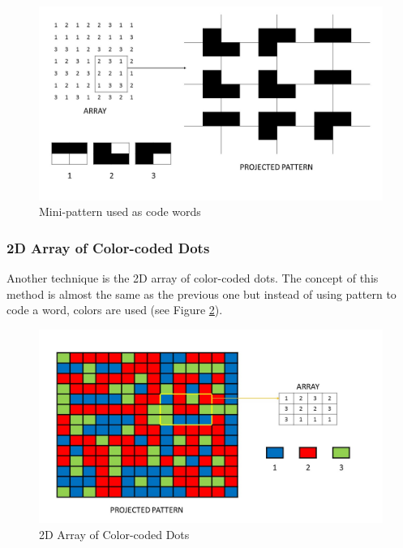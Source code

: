 \begin{figure}[h]
  \centerline{\includegraphics[scale=0.5]{fig/codeWords.jpg}}
  \caption{Mini-pattern used as code words}
  \label{fig:codeWords}
\end{figure}





\subsubsection{2D Array of Color-coded Dots}

Another technique is the 2D array of color-coded dots. The concept of this method is almost the same as the previous one but instead of using pattern to code a word, colors are used (see Figure \ref{fig:color-coded}).

\begin{figure}[h]
  \centerline{\includegraphics[scale=0.5]{fig/color-coded.jpg}}
  \caption{2D Array of Color-coded Dots}
  \label{fig:color-coded}
\end{figure}
